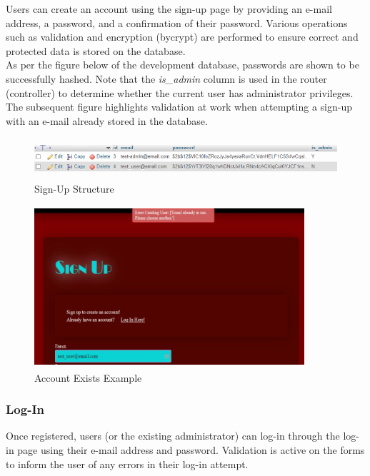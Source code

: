 \documentclass[11pt, english]{article}
\begin{document}
	Users can create an account using the sign-up page by providing an e-mail address, a password, and a confirmation of their password. Various operations such as validation and encryption (bycrypt) are performed to ensure correct and protected data is stored on the database.\\

	As per the figure below of the development database, passwords are shown to be successfully hashed. Note that the \textit{is\_admin} column is used in the router (controller) to determine whether the current user has administrator privileges. The subsequent figure highlights validation at work when attempting a sign-up with an e-mail already stored in the database.

	\begin{figure}[H]
	\begin{center}
		\includegraphics[width=15cm,height=1.5cm]{CS993_IMG/Signup1.png}
		\caption{Sign-Up Structure}
	\end{center}
	\end{figure}

	\begin{figure}[H]
	\begin{center}
		\includegraphics[width=10cm,height=6cm]{CS993_IMG/Signup2.png}
		\caption{Account Exists Example}
	\end{center}
	\end{figure}

		\subsubsection{Log-In}

	Once registered, users (or the existing administrator) can log-in through the log-in page using their e-mail address and password. Validation is active on the forms to inform the user of any errors in their log-in attempt.
\end{document}
